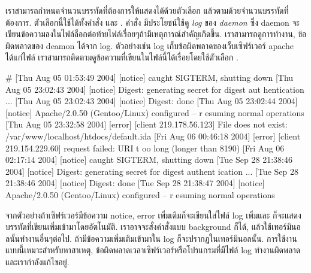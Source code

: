 \begin{thwbr}
เราสามารถกำหนดจำนวนบรรทัดที่ต้องการให้แสดงได้ด้วยตัวเลือก  แล้วตามด้วยจำนวนบรรทัดที่ต้องการ. ตัวเลือกนี้ใช้ได้ทั้งคำสั่ง  และ . คำสั่ง  มีประโยชน์ใช้ดู \emph{log} ของ \emph{daemon} %
%
ซึ่ง daemon จะเขียนข้อความลงในไฟล์ล็อกต่อท้ายไฟล์เรื่อยๆถ้ามีเหตุการณ์สำคัญเกิดขึ้น. เราสามารถดูการทำงาน, ข้อผิดพลาดของ deamon ได้จาก log. ตัวอย่างเช่น log เก็บข้อผิดพลาดของเว็บเซิฟร์เวอร์ apache ได้แก่ไฟล์  เราสามารถติดตามดูข้อความที่เขียนในไฟล์นี้ได้เรื่อยโดยใช้ตัวเลือก .
\begin{MyExample}
\begin{MyEx}
# 
[Thu Aug 05 01:53:49 2004] [notice] caught SIGTERM, shutting down
[Thu Aug 05 23:02:43 2004] [notice] Digest: generating secret for digest aut
hentication ...
[Thu Aug 05 23:02:43 2004] [notice] Digest: done
[Thu Aug 05 23:02:44 2004] [notice] Apache/2.0.50 (Gentoo/Linux) configured -- r
esuming normal operations
[Thu Aug 05 23:32:58 2004] [error] [client 219.178.56.123] File does not exist: 
/var/www/localhost/htdocs/default.ida
[Fri Aug 06 00:46:18 2004] [error] [client 219.154.229.60] request failed: URI t
oo long (longer than 8190)
[Fri Aug 06 02:17:14 2004] [notice] caught SIGTERM, shutting down
[Tue Sep 28 21:38:46 2004] [notice] Digest: generating secret for digest authent
ication ...
[Tue Sep 28 21:38:46 2004] [notice] Digest: done
[Tue Sep 28 21:38:47 2004] [notice] Apache/2.0.50 (Gentoo/Linux) configured -- r
esuming normal operations
\cursorprompt {}
\end{MyEx}
\end{MyExample}
จากตัวอย่างถ้าเซิฟร์เวอร์มีข้อความ notice, error เพิ่มเติมก็จะเขียนใส่ไฟล์ log เพิ่มและ  ก็จะแสดงบรรทัดที่เขียนเพิ่มเข้ามาโดยอัตโนมัติ. เราอาจจะสั่งคำสั่งแบบ background ก็ได้, แล้วใช้เทอร์มินอลนั้นทำงานอื่นๆต่อไป. ถ้ามีข้อความเพิ่มเติมเข้ามาใน log ก็จะปรากฏในเทอร์มินอลนั้น. การใช้งานแบบนี้เหมาะสำหรับหาสาเหตุ, ข้อผิดพลาดเวลาเซิฟร์เวอร์หรือโปรแกรมที่มีไฟล์ log ทำงานผิดพลาดและเรากำลังแก้ไขอยู่.


\end{thwbr}
